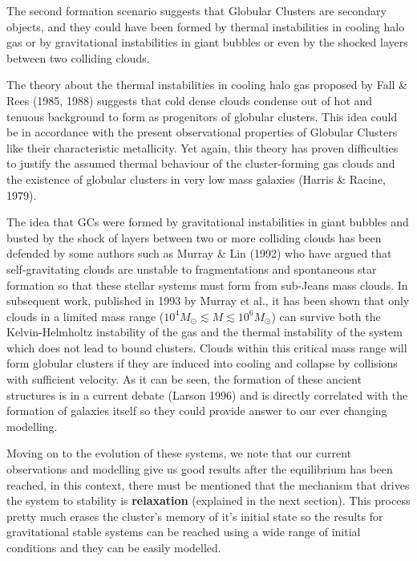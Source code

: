 The second formation scenario suggests that Globular Clusters are secondary objects, and they could have been formed by thermal instabilities in cooling halo gas or by gravitational instabilities in giant bubbles or even by the shocked layers between two colliding clouds. 

The theory about the thermal instabilities in cooling halo gas proposed by Fall \& Rees (1985, 1988)  suggests that cold dense clouds condense out of hot and tenuous background to form as progenitors of globular clusters. This idea could be in accordance with the present observational properties of Globular Clusters like their characteristic metallicity. Yet again, this theory has proven difficulties to justify the assumed thermal behaviour of the cluster-forming gas clouds and the existence of globular clusters in very low mass galaxies (Harris \& Racine, 1979).

The idea that GCs were formed by gravitational instabilities in giant bubbles and busted by the shock of layers between two or more colliding clouds has been defended by some authors such as Murray \& Lin (1992) who have argued that self-gravitating clouds are unstable to fragmentations and spontaneous star formation so that these stellar systems must form from sub-Jeans mass clouds. In subsequent work, published in 1993 by Murray et al., it has been shown that only clouds in a limited mass range ($10^{4}M_\odot\lesssim M\lesssim 10^{6}M_\odot$) can survive both the Kelvin-Helmholtz instability of the gas and the thermal instability of the system which does not lead to bound clusters. Clouds within this critical mass range will form globular clusters if they are induced into cooling and collapse by collisions with sufficient velocity. As it can be seen, the formation of these ancient structures is in a current debate (Larson 1996) and is directly correlated with the formation of galaxies itself so they could provide answer to our ever changing modelling. 

Moving on to the evolution of these systems, we note that our current observations and modelling give us good results after the equilibrium has been reached, in this context, there must be mentioned that the mechanism that drives the system to stability is \textbf{relaxation} (explained in the next section). This process pretty much erases the cluster's memory of it's initial state so the results for gravitational stable systems can be reached using a wide range of initial conditions and they can be easily modelled.

